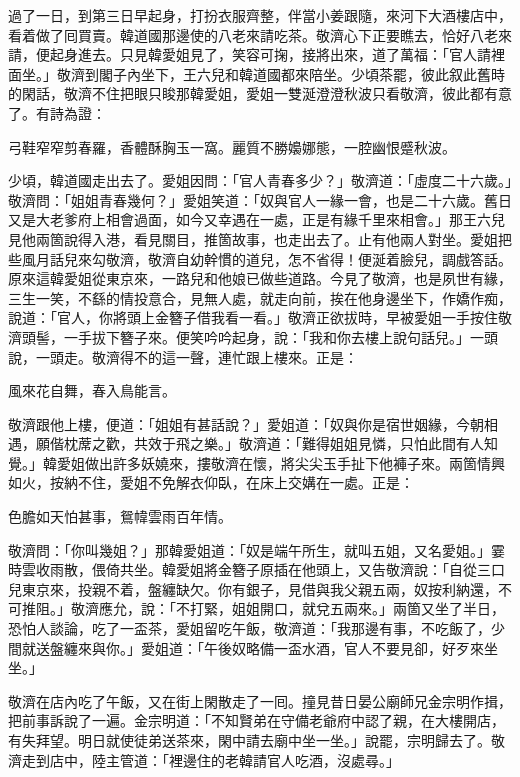過了一日，到第三日早起身，打扮衣服齊整，伴當小姜跟隨，來河下大酒樓店中，看着做了囘買賣。韓道國那邊使的八老來請吃茶。敬濟心下正要瞧去，恰好八老來請，便起身進去。只見韓愛姐見了，笑容可掬，{}接將出來，道了萬福：「官人請裡面坐。」敬濟到閣子內坐下，王六兒和韓道國都來陪坐。少頃茶罷，彼此叙此舊時的閑話，敬濟不住把眼只睃那韓愛姐，愛姐一雙涎澄澄秋波只看敬濟，{}彼此都有意了。有詩為證：

弓鞋窄窄剪春羅，香體酥胸玉一窩。麗質不勝嬝娜態，一腔幽恨蹙秋波。

少頃，韓道國走出去了。愛姐因問：「官人青春多少？」敬濟道：「虛度二十六歲。」敬濟問：「姐姐青春幾何？」愛姐笑道：「奴與官人一緣一會，也是二十六歲。舊日又是大老爹府上相會過面，如今又幸遇在一處，正是有緣千里來相會。」{}那王六兒見他兩箇說得入港，看見關目，推箇故事，也走出去了。{}止有他兩人對坐。愛姐把些風月話兒來勾敬濟，敬濟自幼幹慣的道兒，怎不省得！便涎着臉兒，調戲答話。原來這韓愛姐從東京來，一路兒和他娘已做些道路。{}今見了敬濟，也是夙世有緣，三生一笑，不繇的情投意合，見無人處，就走向前，挨在他身邊坐下，作嬌作痴，說道：「官人，你將頭上金簪子借我看一看。」敬濟正欲拔時，早被愛姐一手按住敬濟頭髻，一手拔下簪子來。{}便笑吟吟起身，說：「我和你去樓上說句話兒。」一頭說，一頭走。敬濟得不的這一聲，連忙跟上樓來。正是：

風來花自舞，春入鳥能言。

敬濟跟他上樓，便道：「姐姐有甚話說？」愛姐道：「奴與你是宿世姻緣，今朝相遇，願偕枕蓆之歡，共效于飛之樂。」敬濟道：「難得姐姐見憐，只怕此間有人知覺。」韓愛姐做出許多妖嬈來，摟敬濟在懷，{}將尖尖玉手扯下他褲子來。兩箇情興如火，按納不住，愛姐不免解衣仰臥，在床上交媾在一處。正是：

色膽如天怕甚事，鴛幃雲雨百年情。

敬濟問：「你叫幾姐？」那韓愛姐道：「奴是端午所生，就叫五姐，又名愛姐。」霎時雲收雨散，偎倚共坐。韓愛姐將金簪子原插在他頭上，又告敬濟說：「自從三口兒東京來，投親不着，盤纏缺欠。你有銀子，見借與我父親五兩，奴按利納還，不可推阻。」敬濟應允，說：「不打緊，姐姐開口，就兌五兩來。」兩箇又坐了半日，恐怕人談論，吃了一盃茶，愛姐留吃午飯，敬濟道：「我那邊有事，不吃飯了，少間就送盤纏來與你。」愛姐道：「午後奴略備一盃水酒，官人不要見卻，好歹來坐坐。」

敬濟在店內吃了午飯，又在街上閑散走了一囘。撞見昔日晏公廟師兄金宗明作揖，把前事訴說了一遍。金宗明道：「不知賢弟在守備老爺府中認了親，在大樓開店，有失拜望。明日就使徒弟送茶來，閑中請去廟中坐一坐。」說罷，宗明歸去了。敬濟走到店中，陸主管道：「裡邊住的老韓請官人吃酒，沒處尋。」

